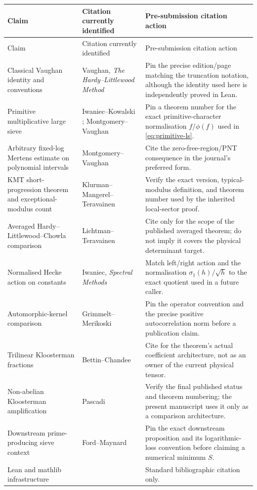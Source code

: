 \small
\begin{longtable}{@{}p{}p{}p{}@{}}
\toprule
Claim & Citation currently identified & Pre-submission citation action \\
\midrule
\endfirsthead
\toprule
Claim & Citation currently identified & Pre-submission citation action \\
\midrule
\endhead
Classical Vaughan identity and conventions
& Vaughan, \emph{The Hardy--Littlewood Method} \cite{Vaughan1997}
& Pin the precise edition/page matching the truncation notation, although the identity used here is independently proved in Lean. \\
Primitive multiplicative large sieve
& Iwaniec--Kowalski \cite{IwaniecKowalski2004}; Montgomery--Vaughan \cite{MontgomeryVaughan2007}
& Pin a theorem number for the exact primitive-character normalisation $f/\phi(f)$ used in \cref{eq:primitive-ls}. \\
Arbitrary fixed-log Mertens estimate on polynomial intervals
& Montgomery--Vaughan \cite{MontgomeryVaughan2007}
& Cite the zero-free-region/PNT consequence in the journal's preferred form. \\
KMT short-progression theorem and exceptional-modulus count
& Klurman--Mangerel--Teravainen \cite{KMT2023}
& Verify the exact version, typical-modulus definition, and theorem number used by the inherited local-sector proof. \\
Averaged Hardy--Littlewood--Chowla comparison
& Lichtman--Teravainen \cite{LichtmanTeravainen2022}
& Cite only for the scope of the published averaged theorem; do not imply it covers the physical determinant target. \\
Normalised Hecke action on constants
& Iwaniec, \emph{Spectral Methods} \cite{Iwaniec2002}
& Match left/right action and the normalisation $\sigma_1(h)/\sqrt h$ to the exact quotient used in a future caller. \\
Automorphic-kernel comparison
& Grimmelt--Merikoski \cite{GrimmeltMerikoski2025}
& Pin the operator convention and the precise positive autocorrelation norm before a publication claim. \\
Trilinear Kloosterman fractions
& Bettin--Chandee \cite{BettinChandee2018}
& Cite for the theorem's actual coefficient architecture, not as an owner of the current physical tensor. \\
Non-abelian Kloosterman amplification
& Pascadi \cite{Pascadi2025}
& Verify the final published status and theorem numbering; the present manuscript uses it only as a comparison architecture. \\
Downstream prime-producing sieve context
& Ford--Maynard \cite{FordMaynard2024}
& Pin the exact downstream proposition and its logarithmic-loss convention before claiming a numerical minimum $S$. \\
Lean and mathlib infrastructure
& \cite{Lean4CADE2021,Mathlib2020}
& Standard bibliographic citation only. \\
\bottomrule
\end{longtable}
\normalsize

